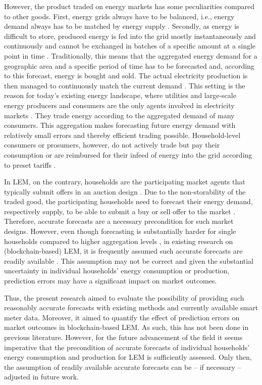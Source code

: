 However, the product traded on energy markets has some peculiarities compared to other goods. First, energy grids always have to be balanced, i.e., energy demand always has to be matched by energy supply \citep{Weron:2006}. Secondly, as energy is difficult to store, produced energy is fed into the grid mostly instantaneously and continuously and cannot be exchanged in batches of a specific amount at a single point in time \citep{Rosen:2013}. Traditionally, this means that the aggregated energy demand for a geographic area and a specific period of time has to be forecasted and, according to this forecast, energy is bought and sold. The actual electricity production is then managed to continuously match the current demand \citep{Rosen:2013}. This setting is the reason for today’s existing energy landscape, where utilities and large-scale energy producers and consumers are the only agents involved in electricity markets \citep{Weron:2006, Buchmann:2013}. They trade energy according to the aggregated demand of many consumers. This aggregation makes forecasting future energy demand with relatively small errors \citep{Meer:2018, Wang:2018} and thereby efficient trading possible. Household-level consumers or prosumers, however, do not actively trade but pay their consumption or are reimbursed for their infeed of energy into the grid according to preset tariffs \citep{Rosen:2013}. 

In LEM, on the contrary, households are the participating market agents that typically submit offers in an auction design \citep{Ilic:2012, Lamparter:2010}. Due to the non-storability of the traded good, the participating households need to forecast their energy demand, respectively supply, to be able to submit a buy or sell offer to the market \citep{Rosen:2013}. Therefore, accurate forecasts are a necessary precondition for such market designs. However, even though forecasting is substantially harder for single households compared to higher aggregation levels \citep{Wang:2018}, in existing research on (blockchain-based) LEM, it is frequently assumed such accurate forecasts are readily available \citep{Rosen:2013, Mengelkamp:2018c, Lamparter:2010, Buchmann:2013, Mengelkamp:2018a}. This assumption may not be correct and given the substantial uncertainty in individual households' energy consumption or production, prediction errors may have a significant impact on market outcomes.

Thus, the present research aimed to evaluate the possibility of providing such reasonably accurate forecasts with existing methods and currently available smart meter data. Moreover, it aimed to quantify the effect of prediction errors on market outcomes in blockchain-based LEM. As such, this has not been done in previous literature. However, for the future advancement of the field it seems imperative that the precondition of accurate forecasts of individual households' energy consumption and production for LEM is sufficiently assessed. Only then, the assumption of readily available accurate forecasts can be -- if necessary -- adjusted in future work.

